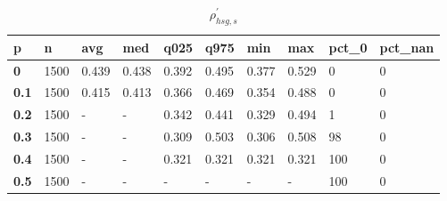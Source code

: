 \begin{table}[h]
 \centering 
\footnotesize
\caption{$\rho_{hsg,s}^\prime $}
\label{tab:alphahsgs}
\begin{tabular}[h]{|l|l|l|l|l|l|l|l|l|l|
    } \hline
\textbf{ p} & \textbf{ n} & \textbf{ avg} & \textbf{ med} & \textbf{ q025} & \textbf{ q975} & \textbf{ min} & \textbf{ max} & \textbf{ pct\_0} & \textbf{ pct\_nan}
    \\ \hline
  \textbf{  0} & 1500 & 0.439 & 0.438 & 0.392 & 0.495 & 0.377 & 0.529 &   0 & 0
    \\ \hline
  \textbf{0.1} & 1500 & 0.415 & 0.413 & 0.366 & 0.469 & 0.354 & 0.488 &   0 & 0
    \\ \hline
  \textbf{0.2} & 1500 & - & - & 0.342 & 0.441 & 0.329 & 0.494 &   1 & 0
    \\ \hline
  \textbf{0.3} & 1500 & - & - & 0.309 & 0.503 & 0.306 & 0.508 &  98 & 0
    \\ \hline
  \textbf{0.4} & 1500 & - & - & 0.321 & 0.321 & 0.321 & 0.321 & 100 & 0
    \\ \hline
  \textbf{0.5} & 1500 & - & - & - & - & - & - & 100 & 0
    \\ \hline
 \end{tabular}
 \end{table}
